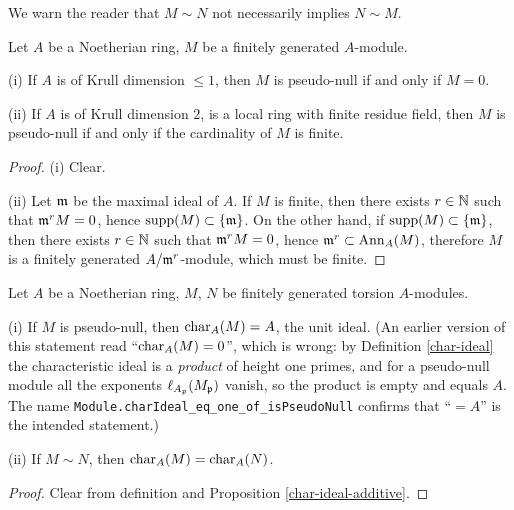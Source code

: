 \begin{remark}
We warn the reader that $M\sim N$ not necessarily implies $N\sim M$.
\end{remark}

\begin{prop}
\label{pseudo-null-criterion}
\leanok
Let $A$ be a Noetherian ring, $M$ be a finitely generated $A$-module.

{\rm(i)} If $A$ is of Krull dimension $\leq 1$, then $M$ is pseudo-null
if and only if $M=0$.

{\rm(ii)} If $A$ is of Krull dimension $2$,
is a local ring with finite residue field, then $M$ is pseudo-null
if and only if the cardinality of $M$ is finite.
\end{prop}

\begin{proof}
\leanok
(i) Clear.

(ii) Let ${\mathfrak{m}}$ be the maximal ideal of $A$.
If $M$ is finite, then there exists $r\in{\mathbb {N}}$
such that ${\mathfrak{m}}^rM=0$, hence ${\mathrm{supp}}(M)\subset\{{\mathfrak{m}}\}$.
On the other hand, if ${\mathrm{supp}}(M)\subset\{{\mathfrak{m}}\}$,
then there exists $r\in{\mathbb {N}}$
such that ${\mathfrak{m}}^rM=0$, hence ${\mathfrak{m}}^r\subset{\mathrm{Ann}}_A(M)$, therefore
$M$ is a finitely generated $A/{\mathfrak{m}}^r$-module, which must be finite.
\end{proof}

\begin{prop}
\label{pseudo-null-char-ideal}
\leanok
Let $A$ be a Noetherian ring, $M$, $N$ be finitely generated torsion $A$-modules.

{\rm(i)} If $M$ is pseudo-null, then $\operatorname{char}_A(M)=A$, the unit ideal.
(An earlier version of this statement read ``$\operatorname{char}_A(M)=0$'', which is wrong:
by Definition \ref{char-ideal} the characteristic ideal is a \emph{product} of
height one primes, and for a pseudo-null module all the exponents
$\ell_{A_{\mathfrak{p}}}(M_{\mathfrak{p}})$ vanish, so the product is empty and equals $A$.
The {\Lean} name \texttt{Module.charIdeal\_eq\_one\_of\_isPseudoNull} confirms
that ``$=A$'' is the intended statement.)

{\rm(ii)} If $M\sim N$, then $\operatorname{char}_A(M)=\operatorname{char}_A(N)$.
\end{prop}

\begin{proof}
\leanok
Clear from definition and Proposition \ref{char-ideal-additive}.
\end{proof}

